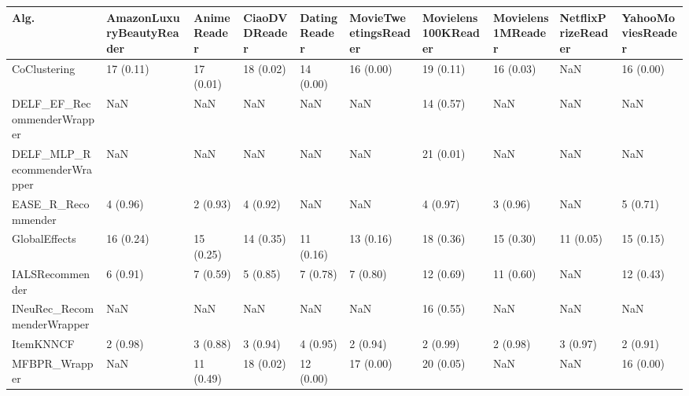 \begin{tabular}{llllllllll}
\toprule
                               Alg. & AmazonLuxuryBeautyReader & AnimeReader & CiaoDVDReader & DatingReader & MovieTweetingsReader & Movielens100KReader & Movielens1MReader & NetflixPrizeReader & YahooMoviesReader \\
\midrule
                       CoClustering &                17 (0.11) &   17 (0.01) &     18 (0.02) &    14 (0.00) &            16 (0.00) &           19 (0.11) &         16 (0.03) &                NaN &         16 (0.00) \\
         DELF\_EF\_RecommenderWrapper &                      NaN &         NaN &           NaN &          NaN &                  NaN &           14 (0.57) &               NaN &                NaN &               NaN \\
        DELF\_MLP\_RecommenderWrapper &                      NaN &         NaN &           NaN &          NaN &                  NaN &           21 (0.01) &               NaN &                NaN &               NaN \\
                 EASE\_R\_Recommender &                 4 (0.96) &    2 (0.93) &      4 (0.92) &          NaN &                  NaN &            4 (0.97) &          3 (0.96) &                NaN &          5 (0.71) \\
                      GlobalEffects &                16 (0.24) &   15 (0.25) &     14 (0.35) &    11 (0.16) &            13 (0.16) &           18 (0.36) &         15 (0.30) &          11 (0.05) &         15 (0.15) \\
                    IALSRecommender &                 6 (0.91) &    7 (0.59) &      5 (0.85) &     7 (0.78) &             7 (0.80) &           12 (0.69) &         11 (0.60) &                NaN &         12 (0.43) \\
         INeuRec\_RecommenderWrapper &                      NaN &         NaN &           NaN &          NaN &                  NaN &           16 (0.55) &               NaN &                NaN &               NaN \\
                          ItemKNNCF &                 2 (0.98) &    3 (0.88) &      3 (0.94) &     4 (0.95) &             2 (0.94) &            2 (0.99) &          2 (0.98) &           3 (0.97) &          2 (0.91) \\
                      MFBPR\_Wrapper &                      NaN &   11 (0.49) &     18 (0.02) &    12 (0.00) &            17 (0.00) &           20 (0.05) &               NaN &                NaN &         16 (0.00) \\

\end{tabular}
